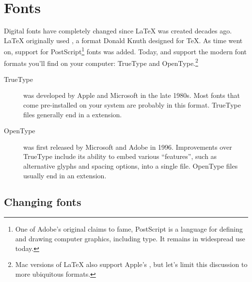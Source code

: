 \chapter{Fonts}
\label{fonts}

Digital fonts have completely changed since \LaTeX{} was created decades ago.
\LaTeX{} originally used \MF,
a format Donald Knuth designed for \TeX{}.
As time went on, support for PostScript\footnote{One of
Adobe's original claims to fame,
PostScript is a language for defining and drawing computer graphics,
including type. It remains in widespread use today.} fonts was added.
Today, \LuaLaTeX{} and \XeLaTeX{} support the modern font formats you'll find
on your computer:
TrueType and OpenType.\punckern\footnote{Mac versions of \LaTeX{} also support
Apple's , but let's limit this discussion to
more ubiquitous formats.}

\begin{description}
\item[TrueType] was developed by Apple and Microsoft in the late 1980s.
    Most fonts that come pre-installed on your system are probably
    in this format.
    TrueType files generally end in a  extension.
\item[OpenType] was first released by Microsoft and Adobe in 1996.
    Improvements over TrueType include its ability to embed
    various ``features''\quotekern, such as alternative glyphs
    and spacing options, into a single file.
    OpenType files usually end in an  extension.
\end{description}

\section{Changing fonts}


